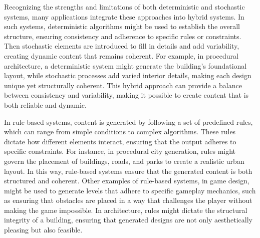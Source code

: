 Recognizing the strengths and limitations of both deterministic and stochastic systems, many applications integrate these approaches into hybrid systems. In such systems, deterministic algorithms might be used to establish the overall structure, ensuring consistency and adherence to specific rules or constraints. Then stochastic elements are introduced to fill in details and add variability, creating dynamic content that remains coherent. For example, in procedural architecture, a deterministic system might generate the building's foundational layout, while stochastic processes add varied interior details, making each design unique yet structurally coherent. This hybrid approach can provide a balance between consistency and variability, making it possible to create content that is both reliable and dynamic.


In rule-based systems, content is generated by following a set of predefined rules, which can range from simple conditions to complex algorithms. These rules dictate how different elements interact, ensuring that the output adheres to specific constraints. For instance, in procedural city generation, rules might govern the placement of buildings, roads, and parks to create a realistic urban layout. In this way, rule-based systems ensure that the generated content is both structured and coherent. Other examples of rule-based systems, in game design, might be used to generate levels that adhere to specific gameplay mechanics, such as ensuring that obstacles are placed in a way that challenges the player without making the game impossible. In architecture, rules might dictate the structural integrity of a building, ensuring that generated designs are not only aesthetically pleasing but also feasible. 

